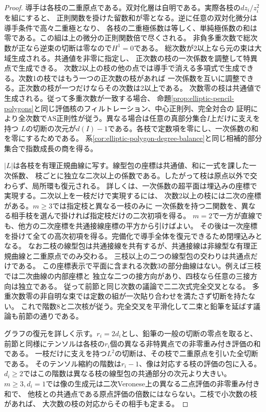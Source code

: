 \begin{proof}
導手は各枝の二重原点である。双対化層は自明である。実際各枝の$dz_i/z_i^2$を組にすると、
正則関数を掛けた留数和が零となる。逆に任意の双対化微分は導手条件で高々二重極となり、
各枝の二重極係数は等しく、単純極係数の和は零である。この組は上の微分の正則関数倍で尽くされる。
非負多重次数で総次数が正なら逆束の切断は零なので$H^1=0$である。
総次数が2以上なら元の束は大域生成される。共通値を非零に指定し、
正次数の枝の一次係数を調整して特異点で生成できる。
次数2以上の枝の他の点では導手で消える多項式で生成できる。次数1の枝ではもう一つの正次数の枝があれば
一次係数を互いに調整できる。正次数の枝が一つだけならその次数は2以上である。
次数零の枝は共通値で生成される。従って多重次数が一致する場合、
命題\ref{prop:elliptic-pencil-polygons}と同じ評価核のフィルトレーション、中心正則列、完全対合の
証明により全次数でAS正則性が従う。異なる場合は任意の真部分集合$I$上だけに支えを持つ
$L$の切断の次元が$d(I)-1$である。各枝で定数項を零にし、一次係数の和を零にするためである。
系\ref{cor:elliptic-polygon-degree-balance}と同じ相補的部分集合で指数成長の商を得る。

$|L|$は各枝を有理正規曲線に写す。線型包の座標は共通値、和に一式を課した一次係数、
枝ごとに独立な二次以上の係数である。したがって枝は原点以外で交わらず、局所環も復元される。
詳しくは、一次係数の超平面は埋込みの座標で実現する。二次以上を一枝だけで実現するには、
次数2以上の枝には二次の座標がある。$m\ge3$では指定枝と異なる一枝のみに
一次係数を持つ二関数を、異なる相手枝を選んで掛ければ指定枝だけの二次初項を得る。
$m=2$で一方が直線でも、他方の二次座標を共通接線座標の平方から引けばよい。
その後は一次座標を掛けて全ての高次初項を得る。完備化で導手全体を復元できるため閉埋込みとなる。
なお二枝の線型包は共通接線を共有するが、共通接線は非線型な有理正規曲線と二重原点でのみ交わる。
三枝以上の二つの線型包の交わりは共通点だけである。
この座標表示で平面に含まれる次数3の部分曲線はない。例えば三枝では二次曲線の内部座標と
独立な二つの接方向があり、四枝なら任意の三接方向は独立である。
従って前節と同じ次数の議論で二二次式完全交叉となる。
多重次数零の非自明な束では定数の組が一次貼り合わせを満たさず切断を持たない。
これで階数8と二次核が従う。完全交叉を平滑化して二束と鉛筆を延ばす議論も前節の通りである。

グラフの復元を詳しく示す。$r_i=2d_i$とし、鉛筆の一般の切断の零点を取ると、
前節と同様にテンソルは各枝の$r_i$個の異なる非特異点での非零重み付き評価の和である。
一枝だけに支えを持つ$L^2$の切断は、その枝で二重原点を引いた全切断である。
そのテンソル縮約の階数は$r_i-1$、像は対応する枝の評価の包に入る。
$d_i\ge2$ではこの階数は異なる枝の線型包の共通部分の次元より大きい。
$m\ge3,d_i=1$では像の生成元は二次Veronese上の異なる二点評価の非零重み付き和で、
他枝との共通点である原点評価の倍数にはならない。二枝で小次数の枝があれば、
大次数の枝の対応からその相手も定まる。


\end{proof}
